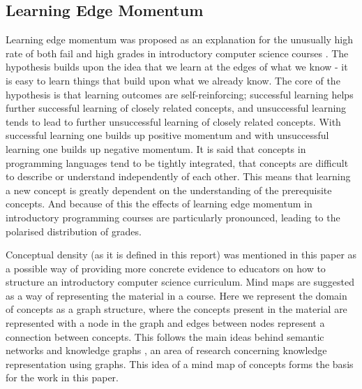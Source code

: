 \documentclass[12pt]{article}
\begin{document}
\subsection{Learning Edge Momentum}
Learning edge momentum was proposed as an explanation for the unusually high rate of both fail and high grades in introductory computer science courses \citep{robins2010learning}. The hypothesis builds upon the idea that we learn at the edges of what we know - it is easy to learn things that build upon what we already know. The core of the hypothesis is that learning outcomes are self-reinforcing; successful learning helps further successful learning of closely related concepts, and unsuccessful learning tends to lead to further unsuccessful learning of closely related concepts. With successful learning one builds up positive momentum and with unsuccessful learning one builds up negative momentum. It is said that concepts in programming languages tend to be tightly integrated, that concepts are difficult to describe or understand independently of each other. This means that learning a new concept is greatly dependent on the understanding of the prerequisite concepts. And because of this the effects of learning edge momentum in introductory programming courses are particularly pronounced, leading to the polarised distribution of grades. 

Conceptual density (as it is defined in this report) was mentioned in this paper as a possible way of providing more concrete evidence to educators on how to structure an introductory computer science curriculum. Mind maps are suggested as a way of representing the material in a course. Here we represent the domain of concepts as a graph structure, where the concepts present in the material are represented with a node in the graph and edges between nodes represent a connection between concepts. This follows the main ideas behind semantic networks and knowledge graphs \citep{sowa1987semantic, zhang2002knowledge, koncel2019text}, an area of research concerning knowledge representation using graphs. This idea of a mind map of concepts forms the basis for the work in this paper.
\end{document}
